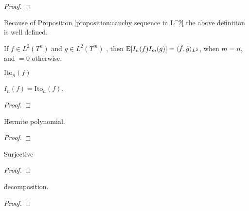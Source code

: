 \begin{proof}
    
\end{proof}

\begin{definition}
    
\end{definition}

\begin{remark}
    Because of 
    \hyperref[proposition:cauchy sequence in L^2]{Proposition \ref*{proposition:cauchy sequence in L^2}}
    the above definition is well defined. 
\end{remark}

\begin{theorem}
    If $f \in L^2(T^n)$ and $g \in L^2(T^m)$
    , then $\operatorname{\mathbb{E}}[I_n(f) I_m(g)] = \langle \tilde{f}, \tilde{g} \rangle_{L^2}$, 
    when $m=n$, and $=0$ otherwise. 
\end{theorem}

\begin{definition}
    $\text{Ito}_n(f)$
\end{definition}

\begin{theorem}
    $I_n(f) = \text{Ito}_n(f)$. 
\end{theorem}

\begin{proof}
    
\end{proof}

\begin{theorem}
    Hermite polynomial. 
\end{theorem}

\begin{proof}
    
\end{proof}

\begin{theorem}
    Surjective
\end{theorem}

\begin{proof}
    
\end{proof}

\begin{theorem}
    decomposition. 
\end{theorem}

\begin{proof}
    
\end{proof}

